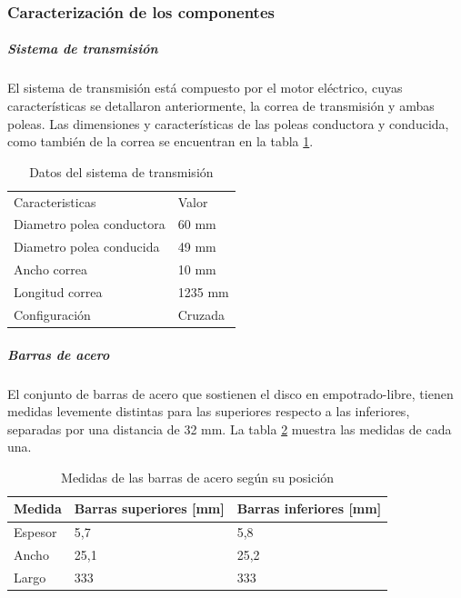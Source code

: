\subsubsection{Caracterización de los componentes}
\subparagraph{Sistema de transmisión}
El sistema de transmisión está compuesto por el motor eléctrico, cuyas características se detallaron anteriormente, la correa de transmisión y ambas poleas. Las dimensiones y características de las poleas conductora y conducida, como también de la correa se encuentran en la tabla \ref{tab:transmision}. %

\begin{table}[h]
\centering
\begin{tabular}{@{}ll@{}} 
\toprule
Caracteristicas           & Valor   \\ %
Diametro polea conductora & 60 mm   \\
Diametro polea conducida  & 49 mm   \\
Ancho correa              & 10 mm   \\
Longitud correa           & 1235 mm \\
Configuración             & Cruzada \\ %
\end{tabular}
\caption{Datos del sistema de transmisión}
\label{tab:transmision}
\end{table}



\subparagraph{Barras de acero}
El conjunto de barras de acero que sostienen el disco en empotrado-libre, tienen medidas levemente distintas para las superiores respecto a las inferiores, separadas por una distancia de 32 mm. La tabla \ref{tab:medidas_barrasacero} muestra las medidas de cada una.
\begin{table}[h]
\centering
\begin{tabular}{@{}lll@{}}
\toprule
Medida  & Barras superiores {[}mm{]} & Barras inferiores {[}mm{]} \\ \midrule
Espesor      & 5,7                        & 5,8                        \\
Ancho        & 25,1                       & 25,2                       \\
Largo        & 333                        & 333                        \\ \bottomrule
\end{tabular}
\caption{Medidas de las barras de acero según su posición}
\label{tab:medidas_barrasacero}
\end{table}


